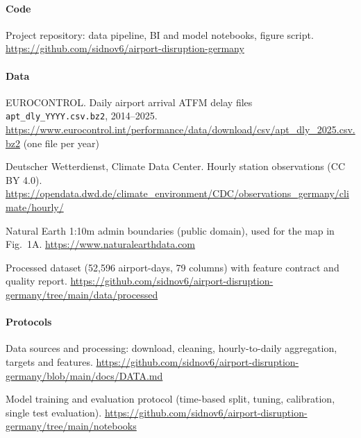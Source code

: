 \documentclass[10pt,a4paper,epsf,apalike]{article}
\newcommand{\repo}{https://github.com/sidnov6/airport-disruption-germany}
\begin{document}
\paragraph{Code}
\begin{enumerate}[label={[\arabic*]}]
\item Project repository: data pipeline, BI and model notebooks, figure script. \url{\repo}
\end{enumerate}

\paragraph{Data}
\begin{enumerate}[label={[\arabic*]}]
\item EUROCONTROL. Daily airport arrival ATFM delay files \texttt{apt\_dly\_YYYY.csv.bz2}, 2014--2025. \url{https://www.eurocontrol.int/performance/data/download/csv/apt_dly_2025.csv.bz2} (one file per year)
\item Deutscher Wetterdienst, Climate Data Center. Hourly station observations (CC BY 4.0). \url{https://opendata.dwd.de/climate_environment/CDC/observations_germany/climate/hourly/}
\item Natural Earth 1:10m admin boundaries (public domain), used for the map in Fig.~1A. \url{https://www.naturalearthdata.com}
\item Processed dataset (52,596 airport-days, 79 columns) with feature contract and quality report. \url{\repo/tree/main/data/processed}
\end{enumerate}

\paragraph{Protocols}
\begin{enumerate}[label={[\arabic*]}]
\item Data sources and processing: download, cleaning, hourly-to-daily aggregation, targets and features. \url{\repo/blob/main/docs/DATA.md}
\item Model training and evaluation protocol (time-based split, tuning, calibration, single test evaluation). \url{\repo/tree/main/notebooks}
\end{enumerate}
\end{document}
